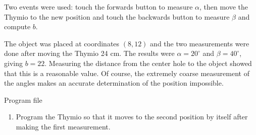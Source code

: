 
Two events were used: touch the forwards button to measure $\alpha$,
then move the Thymio to the new position and touch the backwards button
to measure $\beta$ and compute $b$.

The object was placed at coordinates $(8,12)$ and the two measurements
were done after moving the Thymio 24 cm. The results were
$\alpha=20^{\circ}$ and $\beta=40^{\circ}$, giving $b=22$. Measuring the
distance from the center hole to the object showed that this is a
reasonable value. Of course, the extremely coarse measurement of the
angles makes an accurate determination of the position impossible.

{\raggedleft \hfill Program file }


\begin{enumerate}

\item Program the Thymio so that it moves to the second position by
itself after making the first measurement.

\end{enumerate}
